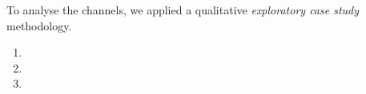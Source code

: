     To analyse the channels, we applied a qualitative \textit{exploratory case study} methodology.


\begin{enumerate}[label=\bfseries{RQ-\arabic*.},itemsep=3pt, topsep=2pt, leftmargin=3em, parsep=0pt]
        \item \rqa
        \item \rqb
        \item \rqc
    \end{enumerate}




